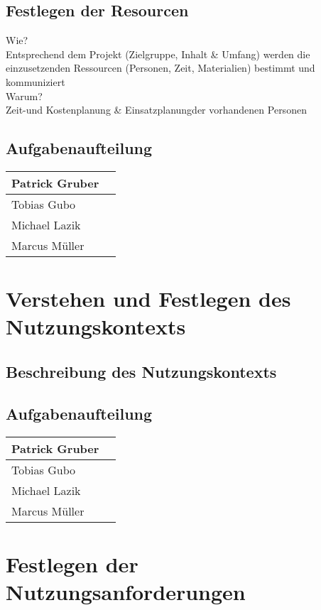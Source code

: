 \documentclass[12pt, a4paper]{scrartcl}
\begin{document}
	\subsection{Festlegen der Resourcen}
	Wie?\\
	Entsprechend dem Projekt (Zielgruppe, Inhalt \& Umfang) werden die einzusetzenden Ressourcen (Personen, Zeit, Materialien) bestimmt und kommuniziert\\
	Warum?\\
	Zeit-und Kostenplanung \& Einsatzplanungder vorhandenen Personen
	
	\subsection*{Aufgabenaufteilung}
	\begin{tabularx}{0.95\textwidth}{|l|X|}
		\hline
		Patrick Gruber & \\
		\hline
		Tobias Gubo & \\
		\hline
		Michael Lazik & \\
		\hline
		Marcus Müller & \\
		\hline
	\end{tabularx}
	
	\newpage
	
	\section{Verstehen und Festlegen des Nutzungskontexts}
	\blindtext[2]
	\subsection{Beschreibung des Nutzungskontexts}
	\blindtext[1]
	
	\subsection*{Aufgabenaufteilung}
	\begin{tabularx}{0.95\textwidth}{|l|X|}
		\hline
		Patrick Gruber & \\
		\hline
		Tobias Gubo & \\
		\hline
		Michael Lazik & \\
		\hline
		Marcus Müller & \\
		\hline
	\end{tabularx}
	
	\newpage
	
	\section{Festlegen der Nutzungsanforderungen}
	\blindtext[2]
\end{document}

